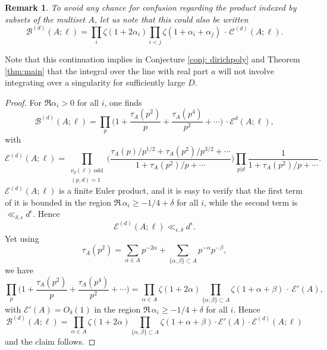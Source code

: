 \documentclass[12pt]{amsart}
\newtheorem{remark}{Remark}
\begin{document}
	\begin{remark}
	To avoid any chance for confusion regarding the product indexed by subsets of the multiset $A$, let us note that this could also be written
	$$
	\mathcal{B}^{(d)}(A;\ell) = \prod_{i} \zeta(1+2\alpha_i) \prod_{i < j} \zeta(1+\alpha_i+\alpha_j)\, \cdot \, \mathcal{C}^{(d)}(A;\ell).
	$$
	\end{remark}
	
	Note that this continuation implies in Conjecture \ref{conj: dirichpoly} and Theorem \ref{thm:main} that the integral over the line with real part $a$ will not involve integrating over a singularity for sufficiently large $D$.
	
	\begin{proof}
		For $\Re  \alpha_i > 0$ for all $i$, one finds
		$$
		\mathcal{B}^{(d)}(A; \ell) = \prod_p \Big(1 + \frac{\tau_A(p^2)}{p} + \frac{\tau_A(p^4)}{p^2} + \cdots \Big) \, \cdot \mathcal{E}^{d}(A;\ell),
		$$
		with
		$$
		\mathcal{E}^{(d)}(A;\ell) = \prod_{\substack{\nu_p(\ell) \; \textrm{odd} \\ (p,d)=1}} \Big(\frac{\tau_A(p)/p^{1/2} + \tau_A(p^2)/p^{3/2} + \cdots}{1 + \tau_A(p^2)/p + \cdots}\Big) \prod_{p|d} \frac{1}{1 + \tau_A(p^2)/p+\cdots}.
		$$
		$\mathcal{E}^{(d)}(A;\ell)$ is a finite Euler product, and it is easy to verify that the first term of it is bounded in the region $\Re\, \alpha_i \geq -1/4+\delta$ for all $i$, while the second term is $\ll_{\delta, \epsilon} d^{\epsilon}$. Hence
		$$
		\mathcal{E}^{(d)}(A;\ell) \ll_{\epsilon, \delta} d^\epsilon.
		$$
		Yet using
		$$
		\tau_A(p^2) = \sum_{\alpha \in A} p^{-2\alpha} + \sum_{\{\alpha,\beta\} \subset A} p^{-\alpha} p^{-\beta},
		$$
		we have
		$$
		\prod_p \Big(1 + \frac{\tau_A(p^2)}{p} + \frac{\tau_A(p^4)}{p^2} + \cdots \Big) = \prod_{\alpha \in A} \zeta(1+2\alpha) \prod_{\{\alpha,\beta\} \subset A} \zeta(1+\alpha+\beta)\, \cdot \, \mathcal{E}'(A),
		$$
		with $\mathcal{E}'(A) = O_\delta(1)$ in the region $\Re\, \alpha_i \geq -1/4+\delta$ for all $i$. Hence
		$$
		\mathcal{B}^{(d)}(A;\ell) = \prod_{\alpha \in A} \zeta(1+2\alpha) \prod_{\{\alpha,\beta\} \subset A} \zeta(1+\alpha+\beta) \cdot \mathcal{E}'(A) \cdot \mathcal{E}^{(d)}(A;\ell)
		$$
		and the claim follows.
	\end{proof}
	
\end{document}
